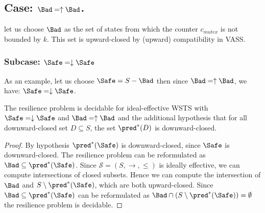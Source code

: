 

\subsection{Case: $\Bad=\uparrow \Bad$.}
%
%

let us choose $\Bad$ as the set of states from which the counter $c_{mutex}$ is not bounded by $k$.
This set is upward-closed by (upward) compatibility in VASS.

\subsubsection{Subcase: $\Safe=\downarrow \Safe$}

As an example, let us choose $\Safe=S-\Bad$ then since $\Bad=\uparrow \Bad$, we have: $\Safe=\downarrow \Safe$.
%
%
\begin{theorem}\label{up-down}
The resilience problem is decidable for ideal-effective WSTS with 
$\Safe=\downarrow \Safe$
and $\Bad=\uparrow \Bad$
and
the additional hypothesis that
for all downward-closed set $D \subseteq S$, the set $\pred^*(D)$ is downward-closed.
\end{theorem}

\begin{proof}
By hypothesis $\pred^*(\Safe)$ is downward-closed, since $\Safe$ is downward-closed.
The resilience problem can be reformulated as 
$\Bad \subseteq  \pred^*(\Safe)$.
Since $\mathscr{S}=(S,\rightarrow, \leq)$ is ideally effective, we can compute intersections of closed  subsets.
Hence we can compute the intersection of
$\Bad$
and
$S \setminus \pred^*(\Safe)$,
which are both upward-closed.
Since
$\Bad \subseteq \pred^*(\Safe)$
can be reformulated as
$\Bad \cap (S \setminus \pred^*(\Safe)) = \emptyset$
the resilience problem is decidable.
\end{proof}


